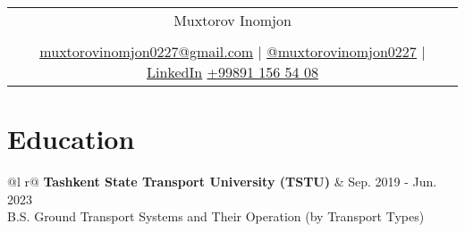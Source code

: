 \documentclass[a4paper,8pt]{article}
\begin{document}
\pagestyle{empty} 


\begin{tabularx}{\linewidth}{@{} C @{}}
\color[HTML]{1C033C} \Huge{Muxtorov Inomjon} \\[6pt]
\\
\textcolor[HTML]{371e77}{\underline{\href{mailto:muxtorovinomjon0227@gmail.com}{\raisebox{-0.05\height}{\faEnvelope} muxtorovinomjon0227@gmail.com}} $|$}
\textcolor[HTML]{371e77}{\underline{\href{https://github.com/muxtorovinomjon0227}{\raisebox{-0.05\height}{\faGithub} @muxtorovinomjon0227}} $|$}
\textcolor[HTML]{371e77}{\underline{\href{https://www.linkedin.com/in/inomjon-muxtorov-55719b248/}{\raisebox{-0.05\height}{\faLinkedin} LinkedIn}}}
\textcolor[HTML]{371e77}{\href{tel:+998911565408}{\raisebox{-0.05\height}{\faMobile} +99891 156 54 08}}
\end{tabularx}

\section{Education}
\begin{tabularx}{\linewidth}{ @{}l r@{} }
\color[HTML]{1C033C} \textbf{Tashkent State Transport University (TSTU)} & \hfill \color[HTML]{371e77} Sep. 2019 - Jun. 2023 \\
\color[HTML]{371e77}B.S. Ground Transport Systems and Their Operation (by Transport Types)  \textit{} \\
\end{tabularx}


\end{document}
